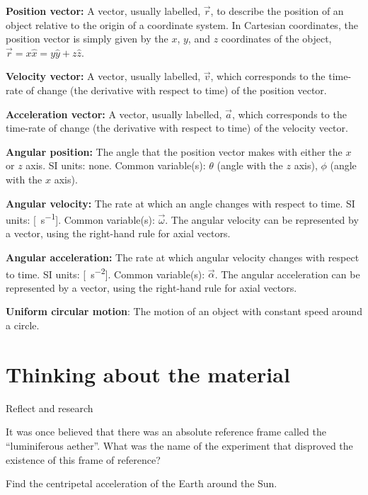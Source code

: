 \begin{definitions}
    \textbf{Position vector:} A vector, usually labelled, $\vec r$, to describe the position of an object relative to the origin of a coordinate system. In Cartesian coordinates, the position vector is simply given by the $x$, $y$, and $z$ coordinates of the object, $\vec r = x\hat x = y \hat y+ z\hat z$.

    \item \textbf{Velocity vector:} A vector, usually labelled, $\vec v$, which corresponds to the time-rate of change (the derivative with respect to time) of the position vector.

    \item \textbf{Acceleration vector:} A vector, usually labelled, $\vec a$, which corresponds to the time-rate of change (the derivative with respect to time) of the velocity vector.

	\item \textbf{Angular position:} The angle that the position vector makes with either the $x$ or $z$ axis. SI units: none. Common variable(s): $\theta$ (angle with the $z$ axis), $\phi$ (angle with the $x$ axis).

	\item \textbf{Angular velocity:} The rate at which an angle changes with respect to time. SI units: [\SI{}{s^{-1}}]. Common variable(s): $\vec \omega$. The angular velocity can be represented by a vector, using the right-hand rule for axial vectors.

	\item \textbf{Angular acceleration:} The rate at which angular velocity changes with respect to time. SI units: [\SI{}{s^{-2}}]. Common variable(s): $\vec \alpha$. The angular acceleration can be represented by a vector, using the right-hand rule for axial vectors. 

	\item \textbf{Uniform circular motion}: The motion of an object with constant speed around a circle.
\end{definitions}

\newpage
\section{Thinking about the material}

\begin{chapteractivity}{Reflect and research}
{
\item It was once believed that there was an absolute reference frame called the ``luminiferous aether''. What was the name of the experiment that disproved the existence of this frame of reference?
\item Find the centripetal acceleration of the Earth around the Sun.
}
\end{chapteractivity}



